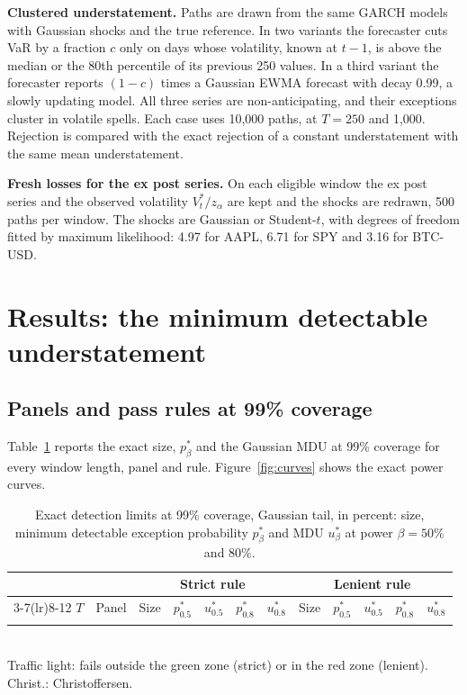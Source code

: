 \documentclass[11pt]{article}
\begin{document}
\textbf{Clustered understatement.} Paths are drawn from the same GARCH models
with Gaussian shocks and the true reference. In two variants the forecaster
cuts VaR by a fraction $c$ only on days whose volatility, known at $t-1$, is
above the median or the 80th percentile of its previous 250 values. In a third
variant the forecaster reports $(1-c)$ times a Gaussian EWMA forecast with
decay 0.99, a slowly updating model. All three series are non-anticipating, and
their exceptions cluster in volatile spells. Each case uses 10,000 paths, at
$T = 250$ and 1,000. Rejection is compared with the exact rejection of a
constant understatement with the same mean understatement.

\textbf{Fresh losses for the ex post series.} On each eligible window the ex
post series and the observed volatility $V^*_t/z_\alpha$ are kept and the shocks
are redrawn, 500 paths per window. The shocks are Gaussian or Student-$t$, with
degrees of freedom fitted by maximum likelihood: 4.97 for AAPL, 6.71 for SPY and
3.16 for BTC-USD.

\section{Results: the minimum detectable understatement}
\label{sec:mdu}

\subsection{Panels and pass rules at 99\% coverage}

Table~\ref{tab:mdu99} reports the exact size, $p^*_\beta$ and the Gaussian MDU
at 99\% coverage for every window length, panel and rule.
Figure~\ref{fig:curves} shows the exact power curves.

\begin{table}[tbp]
\caption{Exact detection limits at 99\% coverage, Gaussian tail, in percent:
size, minimum detectable exception probability $p^*_\beta$ and MDU $u^*_\beta$
at power $\beta = 50\%$ and $80\%$.}
\label{tab:mdu99}
\footnotesize
\centering
\setlength{\tabcolsep}{3pt}
\begin{tabular}{rl rrrrr rrrrr}
\toprule
 & & \multicolumn{5}{c}{Strict rule} & \multicolumn{5}{c}{Lenient rule} \\
\cmidrule(lr){3-7}\cmidrule(lr){8-12}
$T$ & Panel & Size & $p^*_{0.5}$ & $u^*_{0.5}$ & $p^*_{0.8}$ & $u^*_{0.8}$ & Size & $p^*_{0.5}$ & $u^*_{0.5}$ & $p^*_{0.8}$ & $u^*_{0.8}$ \\
\midrule
\\
\bottomrule
\end{tabular}
\\[2pt]
\footnotesize Traffic light: fails outside the green zone (strict) or in the
red zone (lenient). Christ.: Christoffersen.
\end{table}
\end{document}
